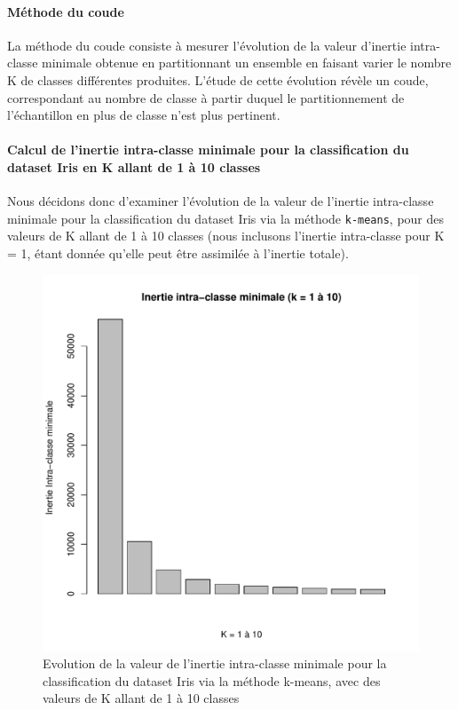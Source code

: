 \documentclass{report}
\begin{document}
\paragraph{Méthode du coude}
La méthode du coude consiste à mesurer l'évolution de la valeur d'inertie intra-classe minimale obtenue en partitionnant un ensemble en faisant varier le nombre K de classes différentes produites. L'étude de cette évolution révèle un coude, correspondant au nombre de classe à partir duquel le partitionnement de l'échantillon en plus de classe n'est plus pertinent.
\newpage
\paragraph{Calcul de l'inertie intra-classe minimale pour la classification du dataset Iris en K allant de 1 à 10 classes}
Nous décidons donc d'examiner l'évolution de la valeur de l'inertie intra-classe minimale pour la classification du dataset Iris via la méthode \verb+k-means+, pour des valeurs de K allant de 1 à 10 classes (nous inclusons l'inertie intra-classe pour K = 1, étant donnée qu'elle peut être assimilée à l'inertie totale).
\begin{figure}[ht!]
\begin{center}
    \includegraphics[width=\textwidth]{../plots/E3Q3_inertieIC.pdf}
    \caption{Evolution de la valeur de l'inertie intra-classe minimale pour la classification du dataset Iris via la méthode k-means, avec des valeurs de K allant de 1 à 10 classes}
\end{center}
\end{figure}
\end{document}
